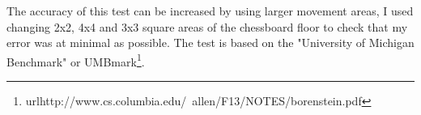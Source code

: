 \documentclass[10pt,a4paper]{article}
\begin{document}
\begin{flushleft}
The accuracy of this test can be increased by using larger movement areas, I used changing 2x2, 4x4 and 3x3 square areas of the chessboard floor to check that my error was at minimal as possible. The test is based on the "University of Michigan Benchmark" or UMBmark\footnote{url{http://www.cs.columbia.edu/~allen/F13/NOTES/borenstein.pdf}}.





\nocite{*}
\newpage

\end{flushleft}
\end{document}
